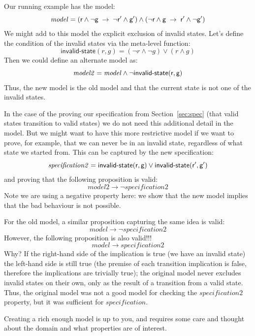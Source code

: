 Our running example has the model:
\begin{equation*}
\mathit{model} =
(\textsf{r}{} \wedge \neg\textsf{g}{} \; \rightarrow \; \neg\textsf{r}{}' \wedge
\textsf{g}{}')
\wedge
(\neg\textsf{r}{} \wedge \textsf{g}{} \; \rightarrow \; \textsf{r}{}' \wedge \neg\textsf{g}{}')
\end{equation*}
%
We might add to this model the explicit exclusion of invalid
states. Let's define the condition of the invalid states via the meta-level function:
%
\begin{equation*}
\textsf{invalid-state}(r, g) = (\neg r \wedge \neg g) \vee (r \wedge g)
\end{equation*}
%
Then we could define an alternate model as:
%
\begin{equation*}
\mathit{model2} = \mathit{model} \wedge \neg \textsf{invalid-state}(\textsf{r}, \textsf{g})
\end{equation*}
%
Thus, the new model is the old model and that the current state is not
one of the invalid states.

In the case of the proving our specification from
Section~\ref{sec:spec} (that valid states transition to valid states)
we do not need this additional detail in the model. But we might want
to have this more restrictive model if we want to prove, for example,
that we can never be in an invalid state, regardless of what state we
started from. This can be captured by the new specification:
%
\begin{equation*}
\mathit{specification2} = \textsf{invalid-state}(\textsf{r}, \textsf{g})
\vee \textsf{invalid-state}(\textsf{r}', \textsf{g}')
\end{equation*}
%
and proving that the following proposition is valid:
$$
\mathit{model2} \rightarrow
\neg \mathit{specification2}
$$
Note we are using a negative property
here: we show that the new model implies that the bad behaviour is not possible.

For the old model, a similar proposition capturing the same idea is valid:
$$
\mathit{model} \rightarrow \neg \mathit{specification2}
$$
However, the following proposition is also valid!!!
$$
\mathit{model} \rightarrow \mathit{specification2}
$$
Why? If the right-hand side of the implication is true (we have an
invalid state) the left-hand side is still true (the premise of each
transition implication is false, therefore the implications are
trivially true); the original model never excludes invalid states on
their own, only as the result of a transition from a valid
state. Thus, the original model was not a good model for checking the
$\mathit{specification2}$ property, but it was sufficient for
$\mathit{specification}$.

Creating a rich enough model is up to you, and requires some care and
thought about the domain and what properties are of interest.

